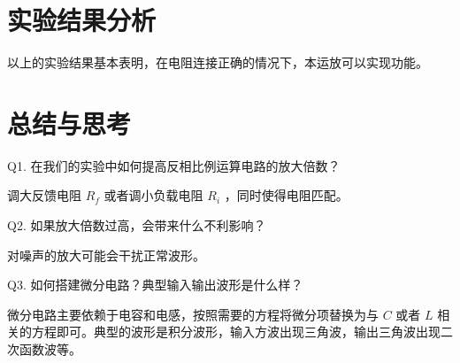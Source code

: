\documentclass[lang=cn,11pt,a4paper,cite=authoryear]{elegantpaper}
\begin{document}


\section{实验结果分析}

以上的实验结果基本表明，在电阻连接正确的情况下，本运放可以实现功能。

\section{总结与思考}


Q1. 在我们的实验中如何提高反相比例运算电路的放大倍数？

调大反馈电阻 \(R_f\) 或者调小负载电阻 \(R_i\) ，同时使得电阻匹配。

Q2. 如果放大倍数过高，会带来什么不利影响？

对噪声的放大可能会干扰正常波形。

Q3. 如何搭建微分电路？典型输入输出波形是什么样？

微分电路主要依赖于电容和电感，按照需要的方程将微分项替换为与 \(C\) 或者 \(L\) 相关的方程即可。典型的波形是积分波形，输入方波出现三角波，输出三角波出现二次函数波等。


\end{document}
